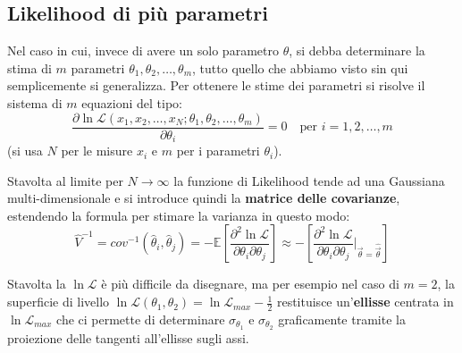 \documentclass[openany,a4paper,12pt]{book}
\providecommand{\mathscr}[1]{\mathcal{#1}}
\theoremstyle{remark}
\begin{document}
\subsection*{Likelihood di più parametri}
Nel caso in cui, invece di avere un solo parametro $\theta$, si debba determinare la stima di $m$ parametri $\theta_1, \theta_2, \dots, \theta_m$, tutto quello che abbiamo visto sin qui semplicemente si generalizza.
Per ottenere le stime dei parametri si risolve il sistema di $m$ equazioni del tipo:
\begin{equation}
    \frac{\partial \ln \mathscr{L}(x_1, x_2, \dots, x_N ; \theta_1, \theta_2, \dots, \theta_m)}{\partial \theta_i} = 0 \quad \text{per } i= 1,2, \dots, m
\end{equation}
(si usa $N$ per le misure $x_i$ e $m$ per i parametri $\theta_i$).

Stavolta al limite per $N \rightarrow \infty$ la funzione di Likelihood tende ad una Gaussiana multi-dimensionale e si introduce quindi la \textbf{matrice delle covarianze}, estendendo la formula per stimare la varianza in questo modo:
\begin{equation}
 \widehat{V}^{-1} = cov^{-1}(\hat{\theta}_i, \hat{\theta}_j) = - \mathbb{E}\left[\frac{\partial^2 \ln \mathscr{L}}{\partial \theta_i \partial \theta_j}\right] \approx - \left[ \frac{\partial^2 \ln \mathscr{L}}{\partial \theta_i \partial \theta_j}\left.\right|_{\vec{\theta}={\hat{\vec{\theta}}}} \right]
\end{equation}

Stavolta la $\ln \mathscr{L}$ è più difficile da disegnare, ma per esempio nel caso di $m=2$, la superficie di livello $\ln \mathscr{L}(\theta_1, \theta_2) = \ln \mathscr{L}_{max} - \frac{1}{2}$ restituisce un'\textbf{ellisse} centrata in $\ln \mathscr{L}_{max}$ che ci permette di determinare $\sigma_{\theta_1}$ e $\sigma_{\theta_2}$ graficamente tramite la proiezione delle tangenti all'ellisse sugli assi.
\end{document}
